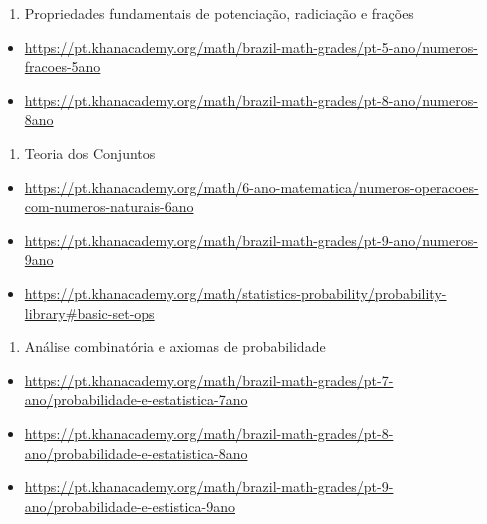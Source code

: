 \documentclass[
]{book}
\providecommand{\tightlist}{%
  \setlength{\itemsep}{0pt}\setlength{\parskip}{0pt}}
\theoremstyle{definition}
\theoremstyle{definition}
\theoremstyle{definition}
\theoremstyle{remark}
\begin{document}
\begin{enumerate}
\def\labelenumi{\arabic{enumi}.}
\tightlist
\item
  Propriedades fundamentais de potenciação, radiciação e frações
\end{enumerate}

\begin{itemize}
\tightlist
\item
  \url{https://pt.khanacademy.org/math/brazil-math-grades/pt-5-ano/numeros-fracoes-5ano}~\\
\item
  \url{https://pt.khanacademy.org/math/brazil-math-grades/pt-8-ano/numeros-8ano}
\end{itemize}

\begin{enumerate}
\def\labelenumi{\arabic{enumi}.}
\setcounter{enumi}{1}
\tightlist
\item
  Teoria dos Conjuntos
\end{enumerate}

\begin{itemize}
\tightlist
\item
  \url{https://pt.khanacademy.org/math/6-ano-matematica/numeros-operacoes-com-numeros-naturais-6ano}~\\
\item
  \url{https://pt.khanacademy.org/math/brazil-math-grades/pt-9-ano/numeros-9ano}~\\
\item
  \url{https://pt.khanacademy.org/math/statistics-probability/probability-library\#basic-set-ops}
\end{itemize}

\begin{enumerate}
\def\labelenumi{\arabic{enumi}.}
\setcounter{enumi}{2}
\tightlist
\item
  Análise combinatória e axiomas de probabilidade
\end{enumerate}

\begin{itemize}
\tightlist
\item
  \url{https://pt.khanacademy.org/math/brazil-math-grades/pt-7-ano/probabilidade-e-estatistica-7ano}~\\
\item
  \url{https://pt.khanacademy.org/math/brazil-math-grades/pt-8-ano/probabilidade-e-estatistica-8ano}~\\
\item
  \url{https://pt.khanacademy.org/math/brazil-math-grades/pt-9-ano/probabilidade-e-estistica-9ano}
\end{itemize}
\end{document}
